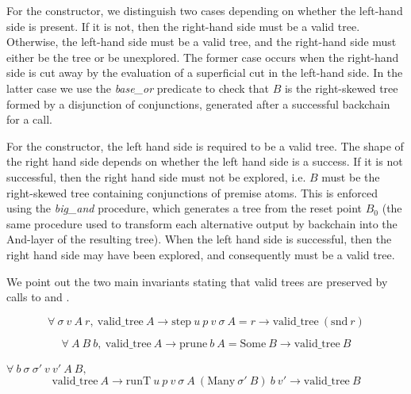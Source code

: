 For the \orC constructor, we distinguish two cases depending on whether the
left-hand side is present. If it is not, then the right-hand side must be a
valid tree. Otherwise, the left-hand side must be a valid tree, and the
right-hand side must either be the \koC tree or be unexplored. The former case
occurs when the right-hand side is cut away by the evaluation of a superficial
cut in the left-hand side.
In the latter case we use the \emph{base\_or} predicate
to check that $B$ is the right-skewed tree formed by a disjunction of
conjunctions, generated after a successful backchain for a call.

For the \andC constructor, the left hand side is required to be a valid tree.
The shape of the right hand side depends on whether the left hand side is a
success. If it is not successful, then the right hand side must not be
explored, i.e. $B$ must be
the right-skewed tree containing conjunctions of premise atoms.
This is enforced using the \emph{big\_and} procedure, which generates a tree
from the reset point $B_0$ (the same procedure used to
transform each alternative output by backchain into the And-layer
of the resulting tree).
When the left hand side is successful, then the right hand side
may have been explored, and consequently must be a valid tree.

We point out the two main invariants stating that valid trees
are preserved by calls to \step and \na.

% 
\begin{lemma}\label{th:validtreestep}%
	$$\forall\ \sigma\ v\ A\ r ,\ \mathrm{valid\_tree}\ A \to \mathrm{step}\ u\ p\ v\ \sigma\ A = r \to \mathrm{valid\_tree}\ (\mathrm{snd}\ r)$$
\end{lemma}

% 
\begin{lemma}\label{th:validtreeprune}%
	$$\forall\ A\ B\ b ,\ \mathrm{valid\_tree}\ A \to \mathrm{prune}\ b\ A = \mathrm{Some}\ B \to \mathrm{valid\_tree}\ B $$
\end{lemma}


% 
\begin{theorem}\label{th:validtreerun}%
	$\forall\ b\ \sigma\ \sigma'\ v\ v'\ A\ B,$
  $$\mathrm{valid\_tree}\ A \to \mathrm{runT}\ u\ p\ v\ \sigma\ A\ ( \mathrm{Many}\ \sigma'\ B )\ b\ v' \to \mathrm{valid\_tree}\ B $$
\end{theorem}

